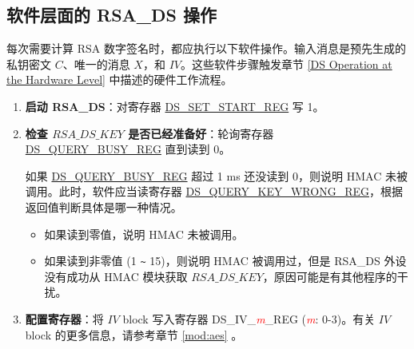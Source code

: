 \documentclass[main\_\_CN.tex]{subfiles}
\begin{document}
\subsection{软件层面的 RSA\_DS 操作}

每次需要计算 RSA 数字签名时，都应执行以下软件操作。输入消息是预先生成的私钥密文 \begin{math}C\end{math}、唯一的消息 \begin{math}X\end{math}，和 \begin{math}IV\end{math}。这些软件步骤触发章节 \ref{DS Operation at the Hardware Level} 中描述的硬件工作流程。

\begin{enumerate}

    \item {\bfseries 启动 RSA\_DS}：对寄存器 \hyperref[regdesc:DSSETSTARTREG]{DS\_SET\_START\_REG} 写 1。

    \item {\bfseries 检查 \begin{math}RSA\_DS\_KEY\end{math} 是否已经准备好}：轮询寄存器 \hyperref[regdesc:DSQUERYBUSYREG]{DS\_QUERY\_BUSY\_REG} 直到读到 0。

    如果 \hyperref[regdesc:DSQUERYBUSYREG]{DS\_QUERY\_BUSY\_REG} 超过 1 ms 还没读到 0，则说明 HMAC 未被调用。此时，软件应当读寄存器 \hyperref[regdesc:DSQUERYKEYWRONGREG]{DS\_QUERY\_KEY\_WRONG\_REG}，根据返回值判断具体是哪一种情况。
    \begin{itemize}

        \item 如果读到零值，说明 HMAC 未被调用。

        \item 如果读到非零值 (1 \verb+~+ 15)，则说明 HMAC 被调用过，但是 RSA\_DS 外设没有成功从 HMAC 模块获取 \begin{math}RSA\_DS\_KEY\end{math}，原因可能是有其他程序的干扰。

    \end{itemize}

    \item {\bfseries 配置寄存器}：将 \begin{math}IV\end{math} block 写入寄存器 DS\_IV\_\textcolor{red}{\it{m}}\_REG (\textcolor{red}{\it{m}}: 0-3)。有关 \begin{math}IV\end{math} block 的更多信息，请参考章节 \ref{mod:aes} \textit{}。


\end{enumerate}
\end{document}
